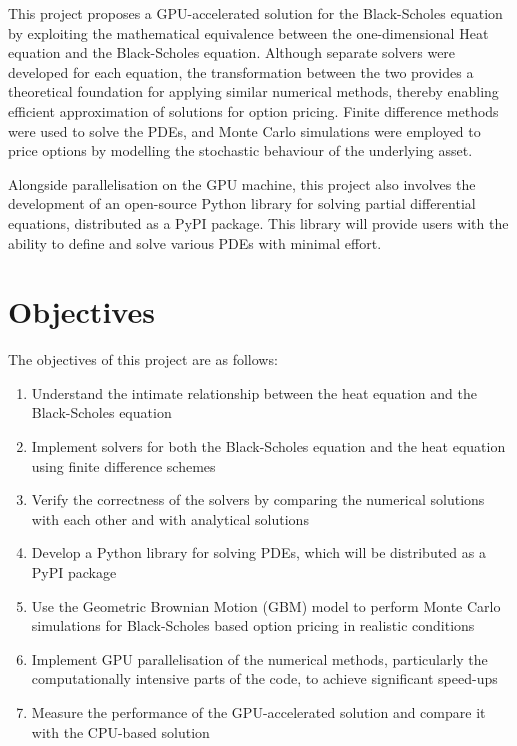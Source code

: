 This project proposes a GPU-accelerated solution for the Black-Scholes equation by exploiting the mathematical equivalence\cite{wilmott_1995_mathematics} between the one-dimensional Heat equation and the Black-Scholes equation. Although separate solvers were developed for each equation, the transformation between the two provides a theoretical foundation for applying similar numerical methods, thereby enabling efficient approximation of solutions for option pricing. Finite difference methods were used to solve the PDEs, and Monte Carlo simulations were employed to price options by modelling the stochastic behaviour of the underlying asset.

Alongside parallelisation on the GPU machine, this project also involves the development of an open-source Python library for solving partial differential equations, distributed as a PyPI package. This library will provide users with the ability to define and solve various PDEs with minimal effort.

\section{Objectives}
The objectives of this project are as follows:
\begin{enumerate}
    \item Understand the intimate relationship between the heat equation and the Black-Scholes equation
    \item Implement solvers for both the Black-Scholes equation and the heat equation using finite difference schemes
    \item Verify the correctness of the solvers by comparing the numerical solutions with each other and with analytical solutions
    \item Develop a Python library for solving PDEs, which will be distributed as a PyPI package
    \item Use the Geometric Brownian Motion (GBM) model to perform Monte Carlo simulations for Black-Scholes based option pricing in realistic conditions
    \item Implement GPU parallelisation of the numerical methods, particularly the computationally intensive parts of the code, to achieve significant speed-ups
    \item Measure the performance of the GPU-accelerated solution and compare it with the CPU-based solution
\end{enumerate}
